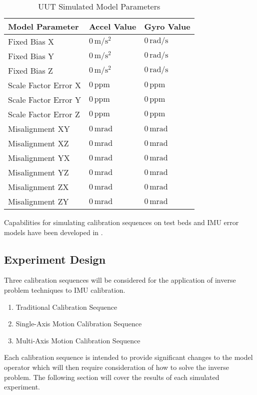 \begin{table}[h!]
	\centering
	\begin{tabular}{|p{4cm}|p{3.5cm}|p{3.5cm}|}
		\hline
		\textbf{Model Parameter} & \textbf{Accel Value} & \textbf{Gyro Value} \\ \hline
		Fixed Bias X & $0 \,\unit{\meter\per\second\squared}$ & $0 \,\unit{\radian\per\second}$ \\ \hline
		Fixed Bias Y & $0 \,\unit{\meter\per\second\squared}$ & $0 \,\unit{\radian\per\second}$ \\ \hline
		Fixed Bias Z & $0 \,\unit{\meter\per\second\squared}$ & $0 \,\unit{\radian\per\second}$ \\ \hline
		Scale Factor Error X & $0 \,\textrm{ppm}$ & $0 \,\textrm{ppm}$ \\ \hline
		Scale Factor Error Y & $0 \,\textrm{ppm}$ & $0 \,\textrm{ppm}$ \\ \hline
		Scale Factor Error Z & $0 \,\textrm{ppm}$ & $0 \,\textrm{ppm}$ \\ \hline
		Misalignment XY & $0 \,\unit{\milli\radian}$ & $0 \,\unit{\milli\radian}$ \\ \hline
		Misalignment XZ & $0 \,\unit{\milli\radian}$ & $0 \,\unit{\milli\radian}$ \\ \hline
		Misalignment YX & $0 \,\unit{\milli\radian}$ & $0 \,\unit{\milli\radian}$ \\ \hline
		Misalignment YZ & $0 \,\unit{\milli\radian}$ & $0 \,\unit{\milli\radian}$ \\ \hline
		Misalignment ZX & $0 \,\unit{\milli\radian}$ & $0 \,\unit{\milli\radian}$ \\ \hline
		Misalignment ZY & $0 \,\unit{\milli\radian}$ & $0 \,\unit{\milli\radian}$ \\ \hline
	\end{tabular}
	\caption{UUT Simulated Model Parameters}
	\label{tab: UUT simulated model parameters}
\end{table}
\FloatBarrier

Capabilities for simulating calibration sequences on test beds and IMU error models have been developed in \MATLAB. 


\subsection{Experiment Design}

Three calibration sequences will be considered for the application of inverse problem techniques to IMU calibration. 

\begin{enumerate}
	\item Traditional Calibration Sequence
	\item Single-Axis Motion Calibration Sequence
	\item Multi-Axis Motion Calibration Sequence
\end{enumerate}
	
Each calibration sequence is intended to provide significant changes to the model operator which will then require consideration of how to solve the inverse problem. The following section will cover the results of each simulated experiment. 

